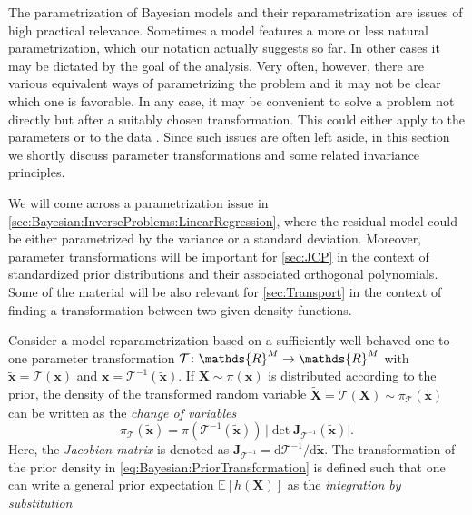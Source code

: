 The parametrization of Bayesian models and their reparametrization are issues of high practical relevance.
Sometimes a model features a more or less natural parametrization, which our notation actually suggests so far.
In other cases it may be dictated by the goal of the analysis.
Very often, however, there are various equivalent ways of parametrizing the problem and it may not be clear which one is favorable.
In any case, it may be convenient to solve a problem not directly but after a suitably chosen transformation.
This could either apply to the parameters \cite{Statistics:Box1962} or to the data \cite{Statistics:Box1964,Bayesian:Box1973}.
Since such issues are often left aside, in this section we shortly discuss parameter transformations and some related invariance principles.
\par %
We will come across a parametrization issue in \cref{sec:Bayesian:InverseProblems:LinearRegression},
where the residual model could be either parametrized by the variance or a standard deviation.
Moreover, parameter transformations will be important for \cref{sec:JCP} in the context of standardized prior distributions and their associated orthogonal polynomials.
Some of the material will be also relevant for \cref{sec:Transport} in the context of finding a transformation between two given density functions.
\par %
Consider a model reparametrization based on a sufficiently well-behaved one-to-one parameter transformation
\(\mathcal{T} \colon \mathds{R}^\dimParam \rightarrow \mathds{R}^\dimParam\) with \(\tilde{\bm{x}} = \mathcal{T}(\bm{x})\) and \(\bm{x} = \mathcal{T}^{-1}(\tilde{\bm{x}})\).
If \(\bm{X} \sim \pi(\bm{x})\) is distributed according to the prior,
the density of the transformed random variable \(\tilde{\bm{X}} = \mathcal{T}(\bm{X}) \sim \pi_{\mathcal{T}}(\tilde{\bm{x}})\) can be written as the \emph{change of variables}
\begin{equation} \label{eq:Bayesian:PriorTransformation}
  \pi_{\mathcal{T}}(\tilde{\bm{x}}) = \pi(\mathcal{T}^{-1}(\tilde{\bm{x}})) \, \lvert \det \bm{J}_{\mathcal{T}^{-1}}(\tilde{\bm{x}}) \rvert.
\end{equation}
Here, the \emph{Jacobian matrix} is denoted as \(\bm{J}_{\mathcal{T}^{-1}} = \mathrm{d} \mathcal{T}^{-1} / \mathrm{d} \tilde{\bm{x}}\).
The transformation of the prior density in \cref{eq:Bayesian:PriorTransformation} is defined such that
one can write a general prior expectation \(\mathds{E}[h(\bm{X})]\) as the \emph{integration by substitution}
